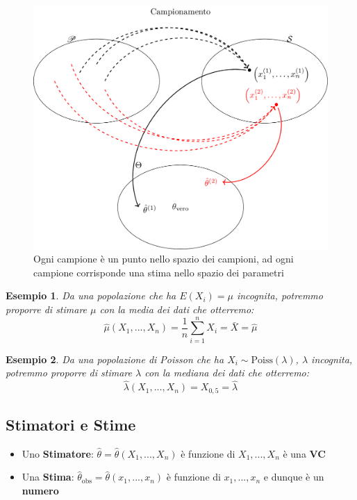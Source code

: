 \documentclass[
  11pt,
]{book}
\providecommand{\tightlist}{%
  \setlength{\itemsep}{0pt}\setlength{\parskip}{0pt}}
\theoremstyle{mytheoremstyle}
\theoremstyle{mydefstyle}
\newtheorem{example}{{Esempio}}[section]
\newenvironment{nota}
  {
\begin{tcolorbox}[enhanced,breakable,arc=0.1mm,boxrule=1pt,colback=white,colframe=iblue,title=\bf \fontfamily{lmss}\selectfont \faInfoCircle \hspace{.5 cm} Nota,drop fuzzy shadow]
}{
\end{tcolorbox}
  }
\begin{document}
\begin{figure}[H]

{\centering \includegraphics[width=0.9\linewidth,]{img/inferenza2-2} 

}

\caption{Ogni campione è un punto nello spazio dei campioni, ad ogni campione corrisponde una stima nello spazio dei parametri}\label{fig:fig-inferenza2}
\end{figure}

\begin{example}
Da una popolazione che ha \(E(X_i)=\mu\) incognita, potremmo proporre di \emph{stimare} \(\mu\) con la media dei dati che \emph{otterremo}:
\[\hat\mu(X_1,...,X_n)=\frac 1 n \sum_{i=1}^n X_i=\bar X=\hat \mu\]
\end{example}

\begin{example}
Da una popolazione di Poisson che ha \(X_i\sim\text{Poiss}(\lambda)\), \(\lambda\) incognita, potremmo proporre di \emph{stimare} \(\lambda\) con la mediana dei dati che \emph{otterremo}:
\[\hat\lambda(X_1,...,X_n)=X_{0,5}=\hat\lambda\]
\end{example}

\subsection{Stimatori e Stime}\label{stimatori-e-stime}

\begin{nota}

\begin{itemize}
\tightlist
\item
  Uno \textbf{Stimatore}: \(\hat\theta=\hat\theta(X_1,...,X_n)\) è funzione di \(X_1,...,X_n\) è una \textbf{VC}
\item
  Una \textbf{Stima}: \(\hat\theta_\text{obs}=\hat\theta(x_1,...,x_n)\) è funzione di \(x_1,...,x_n\) e dunque è un \textbf{numero}
\end{itemize}

\end{nota}
\end{document}
